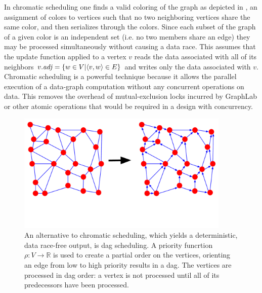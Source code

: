 In chromatic scheduling one
finds a valid coloring of the graph as depicted in 
, an assignment of colors to 
vertices such that no two neighboring vertices share the same color,
and then serializes through the colors.  Since each subset of the graph
of a given color is an independent set (i.e. no two members share an
edge) they may be processed simultaneously without causing a data race.
This assumes that the update function applied to a vertex $v$ reads
the data associated with all of its neighbors 
$\attrib{v}{\id{adj}} = \set{w \in V | \langle v, w \rangle \in E}$ 
and writes only the data
associated with $v$.  Chromatic scheduling is a powerful technique
because it allows the parallel execution of a data-graph computation
without any concurrent operations on data.  This removes the overhead
of mutual-exclusion locks incurred by GraphLab or other atomic operations
that would be required in a design with concurrency.


\begin{figure}[!h]
\centering
\includegraphics[width=4in,clip,trim=0 3cm 0 0]{figures/dag_scheduling.pdf}
\caption{An alternative to chromatic scheduling, which 
yields a deterministic, data race-free output, is dag scheduling.
A priority funcrtion $\rho : V \rightarrow \mathbb{R}$ is used
to create a partial order on the vertices, orienting an edge from
low to high priority results in a 
dag.  The vertices are processed in dag order: a vertex is not
processed until all of its predecessors have been processed.}
\label{fig:dag_scheduling}
\end{figure}


